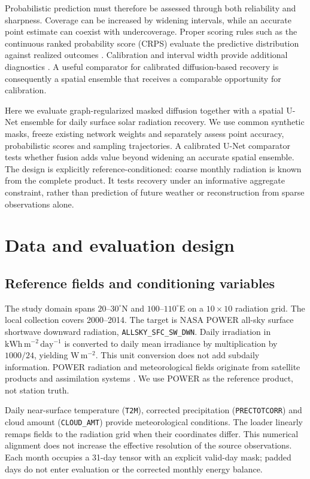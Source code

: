 \documentclass[preprint,12pt,authoryear]{elsarticle}
\newcommand{\wm}{\ensuremath{\mathrm{W\,m^{-2}}}}
\begin{document}
Probabilistic prediction must therefore be assessed through both reliability and sharpness. Coverage can be increased by widening intervals, while an accurate point estimate can coexist with undercoverage. Proper scoring rules such as the continuous ranked probability score (CRPS) evaluate the predictive distribution against realized outcomes \citep{gneiting2007scores}. Calibration and interval width provide additional diagnostics \citep{gneiting2007calibration}. A useful comparator for calibrated diffusion-based recovery is consequently a spatial ensemble that receives a comparable opportunity for calibration.

Here we evaluate graph-regularized masked diffusion together with a spatial U-Net ensemble for daily surface solar radiation recovery. We use common synthetic masks, freeze existing network weights and separately assess point accuracy, probabilistic scores and sampling trajectories. A calibrated U-Net comparator tests whether fusion adds value beyond widening an accurate spatial ensemble. The design is explicitly reference-conditioned: coarse monthly radiation is known from the complete product. It tests recovery under an informative aggregate constraint, rather than prediction of future weather or reconstruction from sparse observations alone.

\section{Data and evaluation design}
\subsection{Reference fields and conditioning variables}
The study domain spans $20$--$30^{\circ}$N and $100$--$110^{\circ}$E on a $10\times10$ radiation grid. The local collection covers 2000--2014. The target is NASA POWER all-sky surface shortwave downward radiation, \texttt{ALLSKY\_SFC\_SW\_DWN}. Daily irradiation in $\mathrm{kWh\,m^{-2}\,day^{-1}}$ is converted to daily mean irradiance by multiplication by $1000/24$, yielding \wm. This unit conversion does not add subdaily information. POWER radiation and meteorological fields originate from satellite products and assimilation systems \citep{powerdata,powerdaily}. We use POWER as the reference product, not station truth.

Daily near-surface temperature (\texttt{T2M}), corrected precipitation (\texttt{PRECTOTCORR}) and cloud amount (\texttt{CLOUD\_AMT}) provide meteorological conditions. The loader linearly remaps fields to the radiation grid when their coordinates differ. This numerical alignment does not increase the effective resolution of the source observations. Each month occupies a 31-day tensor with an explicit valid-day mask; padded days do not enter evaluation or the corrected monthly energy balance.
\end{document}
